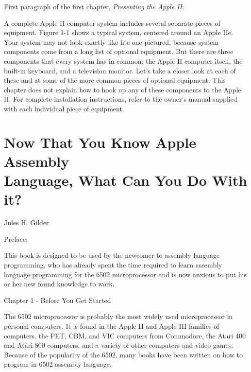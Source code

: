 \documentclass[a4paper,12pt]{article}
\begin{document}
\begin{flushleft}
First paragraph of the first chapter, \textit{Presenting the Apple II}:
\end{flushleft}

\linebreak
\begin{displayquote}
A complete Apple II computer system includes several separate pieces of equipment. Figure 1-1 shows a typical system, centered around an Apple IIe. Your system may not look exactly like hte one pictured, because system components come from a long list of optional equipment. But there are three components that every system has in common: the Apple II computer itself, the built-in keyboard, and a television monitor. Let's take a closer look at each of these and at some of the more common pieces of optional equipment. This chapter does not explain how to hook up any of these components to the Apple II. For complete installation instructions, refer to the owner's manual supplied with each individual piece of equipment.
\end{displayquote}

\section{Now That You Know Apple Assembly \\ Language, What Can You Do With it?}

\begin{flushleft}
Jules H. Gilder
\end{flushleft}

\begin{flushleft}
Preface:
\end{flushleft}
\begin{displayquote}
This book is designed to be used by the newcomer to assembly language programming, who has already spent the time required to learn assembly language programming for the 6502 microprocessor and is now anxious to put his or her new found knowledge to work.
\end{displayquote}

\begin{flushleft}
Chapter 1 - Before You Get Started
\end{flushleft}

\begin{displayquote}
The 6502 microprocessor is probably the most widely used microprocessor in personal computers. It is found in the Apple II and Apple III families of computers, the PET, CBM, and VIC computers from Commodore, the Atari 400 and Atari 800 computers, and a variety of other computers and video games. Because of the popularity of the 6502, many books have been written on how to program in 6502 assembly language.
\end{displayquote}
\end{document}
